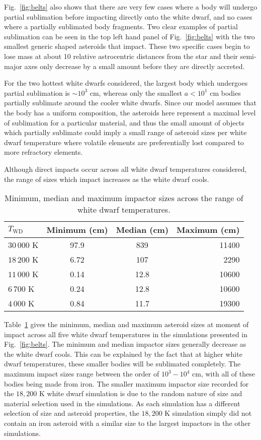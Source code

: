 \documentclass[fleqn,usenatbib]{mnras}
\begin{document}
Fig.~\ref{fig:belts} also shows that there are very few cases where a body will undergo partial sublimation before impacting directly onto the white dwarf, and no cases where a partially sublimated body fragments.
Two clear examples of partial sublimation can be seen in the top left hand panel of Fig.~\ref{fig:belts} with the two smallest generic shaped asteroids that impact.
These two specific cases begin to lose mass at about 10 relative astrocentric distances from the star and their semi-major axes only decrease by a small amount before they are directly accreted.

For the two hottest white dwarfs considered, the largest body which undergoes partial sublimation is $\sim 10^3$ cm, whereas only the smallest $a < 10^1$ cm bodies partially sublimate around the cooler white dwarfs.
Since our model assumes that the body has a uniform composition, the asteroids here represent a maximal level of sublimation for a particular material, and thus the small amount of objects which partially sublimate could imply a small range of asteroid sizes per white dwarf temperature where volatile elements are preferentially lost compared to more refractory elements.

Although direct impacts occur across all white dwarf temperatures considered, the range of sizes which impact increases as the white dwarf cools.
\begin{table}
	\centering
	\caption{Minimum, median and maximum impactor sizes across the range of white dwarf temperatures.}
	\label{tab:impactors}
	\begin{tabular}{lccr}
		\hline
		 $T_\text{WD}$& Minimum (cm) & Median (cm) & Maximum (cm)\\
		\hline
		$30\,000$ K & 97.9 & 839 & 11400\\
	    $18\,200$ K & 6.72 & 107 & 2290 \\	
	    $11\,000$ K & 0.14 & 12.8 & 10600 \\	  
	    $6\,700$ K & 0.24 & 12.8 & 10600 \\
		$4\,000$ K & 0.84 & 11.7 & 19300\\
		\hline
	\end{tabular}
\end{table}
Table~\ref{tab:impactors} gives the minimum, median and maximum asteroid sizes at moment of impact across all five white dwarf temperatures in the simulations presented in Fig.~\ref{fig:belts}. 
The minimum and median impactor sizes generally decrease as the white dwarf cools. 
This can be explained by the fact that at higher white dwarf temperatures, these smaller bodies will be sublimated completely.
The maximum impact sizes range between the order of $10^3-10^4$ cm, with all of these bodies being made from iron.
The smaller maximum impactor size recorded for the $18,200$ K white dwarf simulation is due to the random nature of size and material selection used in the simulations.
As each simulation has a different selection of size and asteroid properties, the $18,200$ K simulation simply did not contain an iron asteroid with a similar size to the largest impactors in the other simulations.
\end{document}

